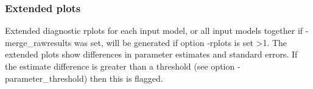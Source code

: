 \subsubsection*{Extended plots}
Extended diagnostic rplots for each input model, or all input models together if -merge\_rawresults was set, 
will be generated if option -rplots is set >1.
The extended plots show differences in parameter estimates and standard errors.
If the estimate difference is greater than a threshold (see option -parameter\_threshold) then this is flagged.
